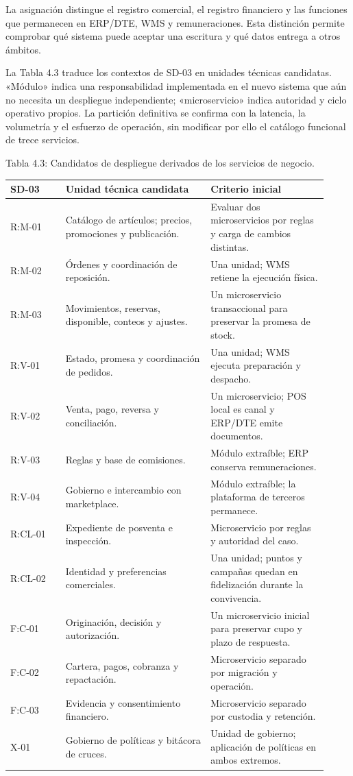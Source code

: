 \documentclass[11pt]{article}
\begin{document}
La asignación distingue el registro comercial, el registro financiero y las funciones que permanecen en ERP/DTE, WMS y remuneraciones. Esta distinción permite comprobar qué sistema puede aceptar una escritura y qué datos entrega a otros ámbitos.

La Tabla 4.3 traduce los contextos de SD-03 en unidades técnicas candidatas. «Módulo» indica una responsabilidad implementada en el nuevo sistema que aún no necesita un despliegue independiente; «microservicio» indica autoridad y ciclo operativo propios. La partición definitiva se confirma con la latencia, la volumetría y el esfuerzo de operación, sin modificar por ello el catálogo funcional de trece servicios.

Tabla 4.3: Candidatos de despliegue derivados de los servicios de negocio.

\begin{longtable}{@{}p{0.16\linewidth}p{0.42\linewidth}p{0.34\linewidth}@{}}
\toprule SD-03 & Unidad técnica candidata & Criterio inicial \\
\midrule\endhead\bottomrule\endlastfoot
R:M-01 & Catálogo de artículos; precios, promociones y publicación. & Evaluar dos microservicios por reglas y carga de cambios distintas. \\
R:M-02 & Órdenes y coordinación de reposición. & Una unidad; WMS retiene la ejecución física. \\
R:M-03 & Movimientos, reservas, disponible, conteos y ajustes. & Un microservicio transaccional para preservar la promesa de stock. \\
R:V-01 & Estado, promesa y coordinación de pedidos. & Una unidad; WMS ejecuta preparación y despacho. \\
R:V-02 & Venta, pago, reversa y conciliación. & Un microservicio; POS local es canal y ERP/DTE emite documentos. \\
R:V-03 & Reglas y base de comisiones. & Módulo extraíble; ERP conserva remuneraciones. \\
R:V-04 & Gobierno e intercambio con marketplace. & Módulo extraíble; la plataforma de terceros permanece. \\
R:CL-01 & Expediente de posventa e inspección. & Microservicio por reglas y autoridad del caso. \\
R:CL-02 & Identidad y preferencias comerciales. & Una unidad; puntos y campañas quedan en fidelización durante la convivencia. \\
F:C-01 & Originación, decisión y autorización. & Un microservicio inicial para preservar cupo y plazo de respuesta. \\
F:C-02 & Cartera, pagos, cobranza y repactación. & Microservicio separado por migración y operación. \\
F:C-03 & Evidencia y consentimiento financiero. & Microservicio separado por custodia y retención. \\
X-01 & Gobierno de políticas y bitácora de cruces. & Unidad de gobierno; aplicación de políticas en ambos extremos. \\
\end{longtable}
\end{document}
